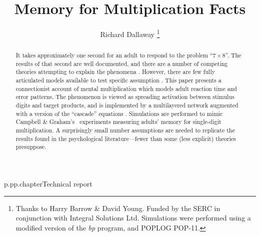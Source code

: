 


\def\refname{References}
%
{p.}{pp.}{chapter}{Technical report}


\newcommand{\x}[2]{\mbox{$#1\times#2$}}
\newcommand{\X}[1]{\mbox{$#1\times$}}

\author{Richard Dallaway%
\thanks{Thanks to Harry Barrow \& David Young. Funded by the SERC in
conjunction with Integral Solutions Ltd. Simulations were performed using a
modified version of the \protect{} {\em bp} program, and POPLOG
POP-11.}
}

\showwherepublished
{}

\title{Memory for Multiplication Facts}
\maketitle


\begin{abstract}
It takes approximately one second for an adult to respond to the problem
``\x78''. The results of that second are well documented, and
there are a number of competing theories attempting to explain the
phenomena \cite{camp85,ashcchil,siegmult}.
However, there are few fully articulated models available to
test specific assumption \cite{mcclmode}. This paper presents a
connectionist account of mental multiplication which models adult reaction
time and error patterns. The phenomenon is viewed as spreading activation
between stimulus digits and target products, and is implemented by a
multilayered network augmented with a version of the ``cascade''
equations \cite{mccascade}.  Simulations are performed to mimic Campbell \&
Graham's~\citeyear{camp85} experiments measuring adults' memory for
single-digit multiplication. A surprisingly small number assumptions
are needed to
replicate the results found in the psychological literature---fewer than
some (less explicit) theories presuppose.
\end{abstract}


